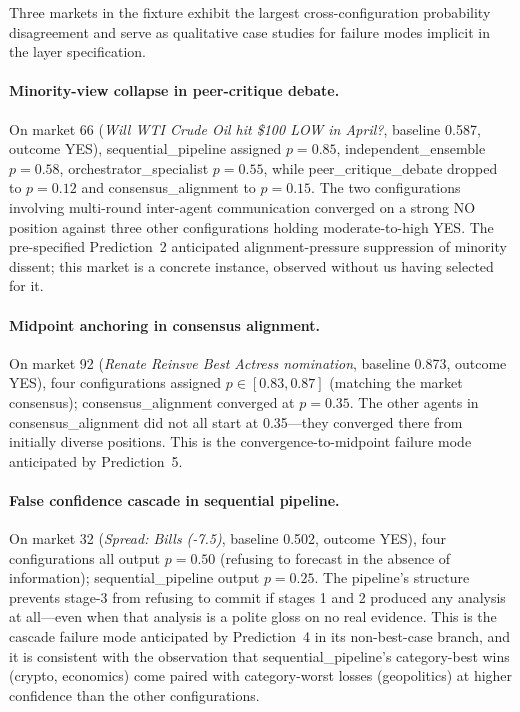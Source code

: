 \documentclass[11pt]{article}
\begin{document}
Three markets in the fixture exhibit the largest cross-configuration probability disagreement and serve as qualitative case studies for failure modes implicit in the layer specification.

\paragraph{Minority-view collapse in peer-critique debate.}
On market 66 (\textit{Will WTI Crude Oil hit \$100 LOW in April?}, baseline 0.587, outcome YES), sequential\_pipeline assigned $p = 0.85$, independent\_ensemble $p = 0.58$, orchestrator\_specialist $p = 0.55$, while peer\_critique\_debate dropped to $p = 0.12$ and consensus\_alignment to $p = 0.15$. The two configurations involving multi-round inter-agent communication converged on a strong NO position against three other configurations holding moderate-to-high YES. The pre-specified Prediction~2 anticipated alignment-pressure suppression of minority dissent; this market is a concrete instance, observed without us having selected for it.

\paragraph{Midpoint anchoring in consensus alignment.}
On market 92 (\textit{Renate Reinsve Best Actress nomination}, baseline 0.873, outcome YES), four configurations assigned $p \in [0.83, 0.87]$ (matching the market consensus); consensus\_alignment converged at $p = 0.35$. The other agents in consensus\_alignment did not all start at 0.35---they converged there from initially diverse positions. This is the convergence-to-midpoint failure mode anticipated by Prediction~5.

\paragraph{False confidence cascade in sequential pipeline.}
On market 32 (\textit{Spread: Bills (-7.5)}, baseline 0.502, outcome YES), four configurations all output $p = 0.50$ (refusing to forecast in the absence of information); sequential\_pipeline output $p = 0.25$. The pipeline's structure prevents stage-3 from refusing to commit if stages 1 and 2 produced any analysis at all---even when that analysis is a polite gloss on no real evidence. This is the cascade failure mode anticipated by Prediction~4 in its non-best-case branch, and it is consistent with the observation that sequential\_pipeline's category-best wins (crypto, economics) come paired with category-worst losses (geopolitics) at higher confidence than the other configurations.
\end{document}
